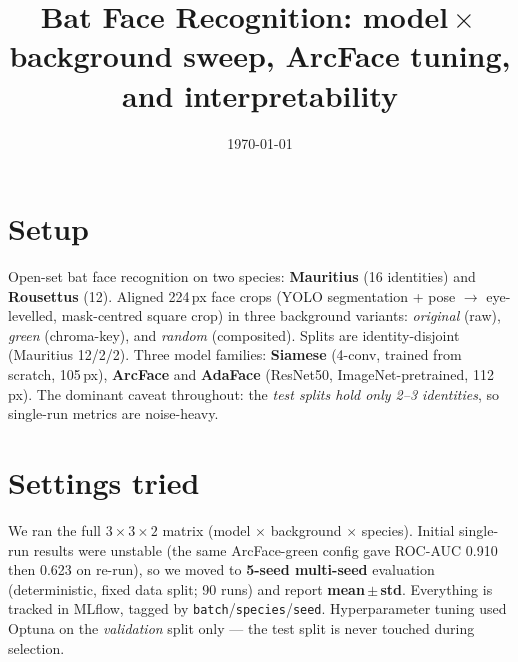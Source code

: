\documentclass[10pt]{article}
\title{\vspace{-1.2cm}Bat Face Recognition: model\,$\times$\,background sweep,
ArcFace tuning, and interpretability}
\author{}
\date{\today}
\begin{document}
\maketitle
\vspace{-1.0cm}

\section{Setup}
Open-set bat face recognition on two species: \textbf{Mauritius} (16 identities) and
\textbf{Rousettus} (12). Aligned 224\,px face crops (YOLO segmentation + pose $\rightarrow$
eye-levelled, mask-centred square crop) in three background variants: \emph{original} (raw),
\emph{green} (chroma-key), and \emph{random} (composited). Splits are identity-disjoint
(Mauritius 12/2/2). Three model families: \textbf{Siamese} (4-conv, trained from scratch, 105\,px),
\textbf{ArcFace} and \textbf{AdaFace} (ResNet50, ImageNet-pretrained, 112\,px). The dominant caveat
throughout: the \emph{test splits hold only 2--3 identities}, so single-run metrics are noise-heavy.

\section{Settings tried}
We ran the full $3\times3\times2$ matrix (model $\times$ background $\times$ species). Initial
single-run results were unstable (the same ArcFace-green config gave ROC-AUC 0.910 then 0.623 on
re-run), so we moved to \textbf{5-seed multi-seed} evaluation (deterministic, fixed data split;
90 runs) and report \textbf{mean\,$\pm$\,std}. Everything is tracked in MLflow, tagged by
\texttt{batch}/\texttt{species}/\texttt{seed}. Hyperparameter tuning used Optuna on the
\emph{validation} split only --- the test split is never touched during selection.
\end{document}
